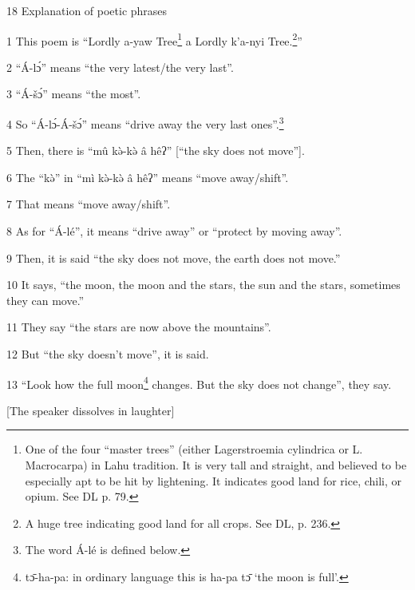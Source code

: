 
18 Explanation of poetic phrases

1 This poem is ``Lordly a-yaw Tree\footnote{One of the four ``master trees'' (either Lagerstroemia cylindrica or L. Macrocarpa) in Lahu tradition. It is very tall and straight, and believed to be especially apt to be hit by lightening. It indicates good land for rice, chili, or opium. See DL p. 79.} a Lordly k'a-nyi Tree.\footnote{A huge tree indicating good land for all crops. See DL, p. 236.}''

2 ``Á-lɔ́'' means ``the very latest/the very last''.

3 ``Á-šɔ́'' means ``the most''.

4 So ``Á-lɔ́-Á-šɔ́'' means ``drive away the very last ones''.\footnote{The word Á-lé is defined below.}

5 Then, there is ``mû kə̀-kə̀ â hêʔ'' [``the sky does not move''].

6 The ``kə̀'' in ``mì kə̀-kə̀ â hêʔ'' means ``move away/shift''.

7 That means ``move away/shift''.

8 As for ``Á-lé'', it means ``drive away'' or ``protect by moving away''.

9 Then, it is said ``the sky does not move, the earth does not move.''

10 It says, ``the moon, the moon and the stars, the sun and the stars, sometimes
they can move.''

11 They say ``the stars are now above the mountains''.

12 But ``the sky doesn't move'', it is said.

13 ``Look how the full moon\footnote{tɔ̄-ha-pa: in ordinary language this is ha-pa tɔ̄ `the moon is full'.} changes. But the sky does not change'', they say.

[The speaker dissolves in laughter]

